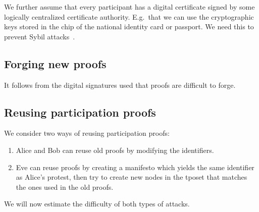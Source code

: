 
We further assume that every participant has a digital certificate signed by 
some logically centralized certificate authority.
E.g.\ that we can use the cryptographic keys stored in the chip of the national 
identity card or passport.
We need this to prevent Sybil attacks~\cite{SybilAttack}.

\subsection{Forging new proofs}

It follows from the digital signatures used that proofs are difficult to forge.

\subsection{Reusing participation proofs}

We consider two ways of reusing participation proofs:
\begin{enumerate}
  \item Alice and Bob can reuse old proofs by modifying the identifiers.
  \item Eve can reuse proofs by creating a manifesto which yields the same 
    identifier as Alice's protest, then try to create new nodes in the 
    \ac{tposet} that matches the ones used in the old proofs.
\end{enumerate}
We will now estimate the difficulty of both types of attacks.

